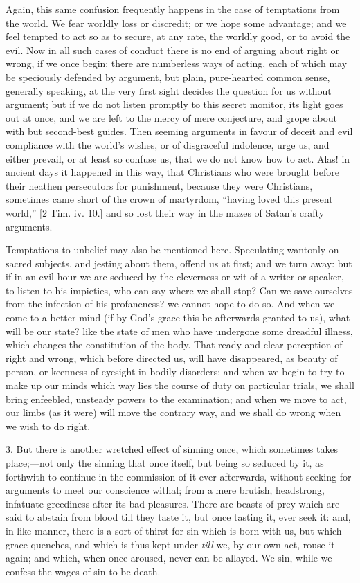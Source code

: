 Again, this same confusion frequently happens in the case of
temptations from the world. We fear worldly loss or discredit; or we
hope some advantage; and we feel tempted to act so as to secure, at
any rate, the worldly good, or to avoid the evil. Now in all such
cases of conduct there is no end of arguing about right or wrong, if
we once begin; there are numberless ways of acting, each of which may
be speciously defended by argument, but plain, pure-hearted common
sense, generally speaking, at the very first sight decides the
question for us without argument; but if we do not listen promptly to
this secret monitor, its light goes out at once, and we are left to
the mercy of mere conjecture, and grope about with but second-best
guides. Then seeming arguments in favour of deceit and evil compliance
with the world's wishes, or of disgraceful indolence, urge us, and
either prevail, or at least so confuse us, that we do not know how to
act. Alas! in ancient days it happened in this way, that Christians
who were brought before their heathen persecutors for punishment,
because they were Christians, sometimes came short of the crown of
martyrdom, ``having loved this present world,'' [2 Tim. iv.
10.] and so lost their way in the mazes of Satan's crafty arguments.

Temptations to unbelief may also be mentioned here. Speculating
wantonly on sacred subjects, and jesting about them, offend us at
first; and we turn away: but if in an evil hour we are seduced by the
cleverness or wit of a writer or speaker, to listen to his impieties,
who can say where we shall stop? Can we save ourselves from the
infection of his profaneness? we cannot hope to do so. And when we
come to a better mind (if by God's grace this be afterwards granted to
us), what will be our state? like the state of men who have undergone
some dreadful illness, which changes the constitution of the body.
That ready and clear perception of right and wrong, which before
directed us, will have disappeared, as beauty of person, or keenness
of eyesight in bodily disorders; and when we begin to try to make up
our minds which way lies the course of duty on particular trials, we
shall bring enfeebled, unsteady powers to the examination; and when we
move to act, our limbs (as it were) will move the contrary way, and we
shall do wrong when we wish to do right.

3. But there is another wretched effect of sinning once, which
sometimes takes place;—not only the sinning that once itself, but
being so seduced by it, as forthwith to continue in the commission of
it ever afterwards, without seeking for arguments to meet our
conscience withal; from a mere brutish, headstrong, infatuate
greediness after its bad pleasures. There are beasts of prey which are
said to abstain from blood till they taste it, but once tasting it,
ever seek it: and, in like manner, there is a sort of thirst for sin
which is born with us, but which grace quenches, and which is thus
kept under \emph{till} we, by our own act, rouse it again; and which,
when once aroused, never can be allayed. We sin, while we confess the
wages of sin to be death.

